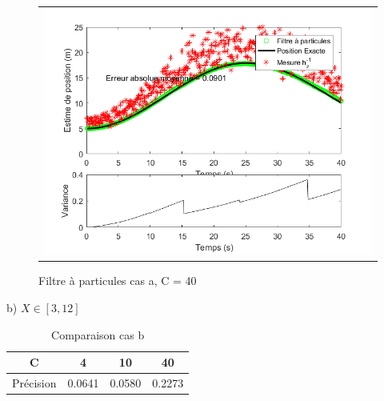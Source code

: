 \documentclass[11pt]{article}		%
\begin{document}
\vspace{-0.3in}
\label{FP}
\begin{figure}[ht]
 \begin{center}
  \begin{tabular}{c}
    \includegraphics[width=1.0\textwidth]{fp1.png} 
  \end{tabular}
 \end{center}
 \vspace{-0.3in}
 \caption{Filtre à particules cas a, C = 40}
 \label{FP1}
\end{figure}

\noindent b) $X \in [3, 12]$ \\

\begin{table}[!ht]
\centering
\begin{tabular}{| c | c | c | c |}
 \hline
  C            &    4      &   10   &   40  \\ 
 \hline
  Précision    &  0.0641   & 0.0580 & 0.2273 \\ 
 \hline
\end{tabular}
\caption{Comparaison cas b}
\label{tab:FilterParticle1}
\end{table}
\end{document}
